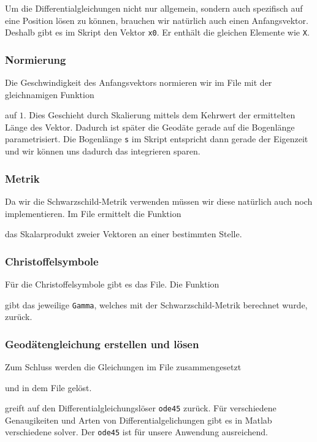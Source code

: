 \begin{refsection}
    Um die Differentialgleichungen nicht nur allgemein, sondern auch spezifisch auf eine Position lösen zu können, brauchen wir natürlich auch einen Anfangsvektor. Deshalb gibt es im Skript den Vektor \texttt{x0}. Er enthält die gleichen Elemente wie \texttt{X}.
    
    \subsubsection{Normierung}
    Die Geschwindigkeit des Anfangsvektors normieren wir im File  mit der gleichnamigen Funktion 
     
    auf $1$. Dies Geschieht durch Skalierung mittels dem Kehrwert der ermittelten Länge des Vektor. Dadurch ist später die Geodäte gerade auf die Bogenlänge parametrisiert. Die Bogenlänge \texttt{s} im Skript entspricht dann gerade der Eigenzeit und wir können uns dadurch das integrieren sparen.
    
    \subsubsection{Metrik}
    Da wir die Schwarzschild-Metrik verwenden müssen wir diese natürlich auch noch implementieren.
    Im File  ermittelt die Funktion
     
    das Skalarprodukt zweier Vektoren an einer bestimmten Stelle.
    \subsubsection{Christoffelsymbole}
    Für die Christoffelsymbole gibt es das  File. Die Funktion 
     
    gibt das jeweilige \texttt{Gamma}, welches mit der Schwarzschild-Metrik berechnet wurde, zurück.
    \subsubsection{Geodätengleichung erstellen und lösen}
    Zum Schluss werden die Gleichungen im File  zusammengesetzt
     
    und in dem File  gelöst. 
     
     greift auf den Differentialgleichungslöser \texttt{ode45} zurück. Für verschiedene Genaugikeiten und Arten von Differentialgelichungen gibt es in Matlab verschiedene solver. Der \texttt{ode45} ist für unsere Anwendung ausreichend.
    

\end{refsection}

